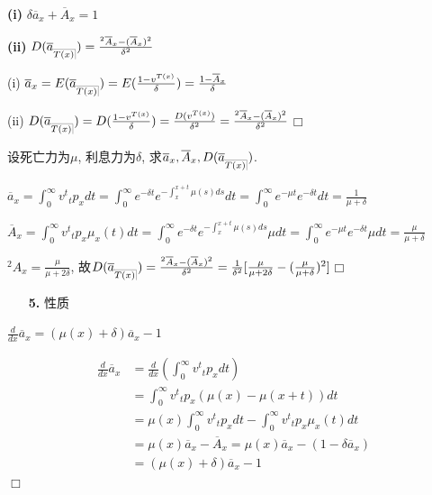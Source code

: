 \documentclass[a4paper,10pt]{ctexbook}
\makeatletter
\newcommand{\hei}{\CJKfamily{hei}}      %
\def\qed{\hfill$\Box$\medskip}
\DeclareRobustCommand{\annu}[1]{_{%
    \def\arraystretch{0}%
    \setlength\arraycolsep{1pt}%
    \setlength\arrayrulewidth{.2pt}%
    \begin{array}[b]{@{}c|}\hline
        \\[\arraycolsep]%
        \scriptstyle #1%
    \end{array}%
}}
\makeatother
\begin{document}
{\rm\bf(i)} $\delta \overline{a}_x + \overline{A}_x = 1$

{\rm\bf(ii)} $D(\overline{a}_{\annu{T(x)}}) = \frac{{}^2\overline{A}_x - (\overline{A}_x)^2}{\delta^2}$

\proof (i) $\overline{a}_x = E(\overline{a}_{\annu{T(x)}}) = E(\frac{1-v^{T(x)}}{\delta}) = \frac{1-\overline{A}_x}{\delta}$

(ii) $D(\overline{a}_{\annu{T(x)}}) = D(\frac{1-v^{T(x)}}{\delta}) = \frac{D(v^{T(x)})}{\delta^2} = \frac{{}^2\overline{A}_x - (\overline{A}_x)^2}{\delta^2}$\qed

\begin{example}
    设死亡力为$\mu$, 利息力为$\delta$, 求$\overline{a}_x, \overline{A}_x, D(\overline{a}_{\annu{T(x)}})$.
\end{example}
\solution $\overline{a}_x = \int_0^{\infty} v^t {}_tp_xdt = \int_0^{\infty} e^{-\delta t}e^{-\int_{x}^{x+t}\mu(s)ds}dt = \int_0^{\infty} e^{-\mu t}e^{-\delta t}dt = \frac{1}{\mu+\delta}$

$\overline{A}_x = \int_0^{\infty} v^t {}_tp_x\mu_x(t)dt = \int_0^{\infty} e^{-\delta t}e^{-\int_{x}^{x+t}\mu(s)ds}\mu dt = \int_0^{\infty} e^{-\mu t}e^{-\delta t}\mu dt = \frac{\mu}{\mu+\delta}$

${}^2A_x = \frac{\mu}{\mu+2\delta}$, 故$D(\overline{a}_{\annu{T(x)}}) = \frac{{}^2\overline{A}_x - (\overline{A}_x)^2}{\delta^2} = \frac{1}{\delta^2}[\frac{\mu}{\mu+2\delta} - (\frac{\mu}{\mu+\delta})^2]$\qed

\begin{itemize}
    \item[{\bf\hei 5.}]性质
\end{itemize}

$\frac{d}{dx}\overline{a}_x = (\mu(x)+\delta)\overline{a}_x-1$

\proof
\begin{align*}
    \frac{d}{dx}\overline{a}_x
     & = \frac{d}{dx}(\int_0^{\infty} v^t{}_tp_x dt)                                              \\
     & = \int_0^{\infty} v^t{}_tp_x(\mu(x) - \mu(x+t)) dt                                         \\
     & = \mu(x)\int_0^{\infty} v^t{}_tp_x dt - \int_0^{\infty} v^t{}_tp_x\mu_x(t) dt              \\
     & = \mu(x)\overline{a}_x - \overline{A}_x  = \mu(x)\overline{a}_x - (1-\delta\overline{a}_x) \\
     & = (\mu(x)+\delta)\overline{a}_x-1
\end{align*}
\qed
\end{document}
